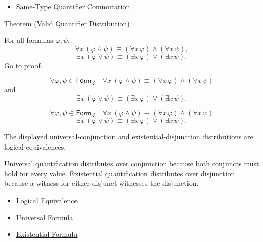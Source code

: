 \begin{dependencies}
\begin{itemize}
  \item \hyperref[thm:qcomm]{Same-Type Quantifier Commutation}
\end{itemize}
\end{dependencies}

\begin{theorembox}{Theorem (Valid Quantifier Distribution)}
\begin{theorem}
\label{thm:qdist}
For all formulas \(\varphi,\psi\),
\[
\forall x\,(\varphi\land\psi)
\equiv
(\forall x\,\varphi)\land(\forall x\,\psi),
\]
\[
\exists x\,(\varphi\lor\psi)
\equiv
(\exists x\,\varphi)\lor(\exists x\,\psi).
\]
\hyperref[prf:qdist]{Go to proof.}
\end{theorem}
\end{theorembox}

\begin{remark*}
\[
\forall \varphi,\psi\in\mathsf{Form}_{\mathcal L}\quad
\forall x\,(\varphi\land\psi)
\equiv
(\forall x\,\varphi)\land(\forall x\,\psi)
\]
and
\[
\exists x\,(\varphi\lor\psi)
\equiv
(\exists x\,\varphi)\lor(\exists x\,\psi).
\]
\end{remark*}

\begin{remark*}
\[
\forall \varphi,\psi\in\mathsf{Form}_{\mathcal L}\quad
\forall x\,(\varphi\land\psi)
\equiv
(\forall x\,\varphi)\land(\forall x\,\psi)
\]
\[
\exists x\,(\varphi\lor\psi)
\equiv
(\exists x\,\varphi)\lor(\exists x\,\psi).
\]
\end{remark*}



\begin{remark*}[Interpretation]
The displayed universal-conjunction and existential-disjunction distributions
are logical equivalences.

Universal quantification distributes over conjunction because both conjuncts
must hold for every value. Existential quantification distributes over
disjunction because a witness for either disjunct witnesses the disjunction.
\end{remark*}

\begin{dependencies}
\begin{itemize}
  \item \hyperref[def:log-equiv]{Logical Equivalence}
  \item \hyperref[def:universal-q]{Universal Formula}
  \item \hyperref[def:existential-q]{Existential Formula}
\end{itemize}
\end{dependencies}

